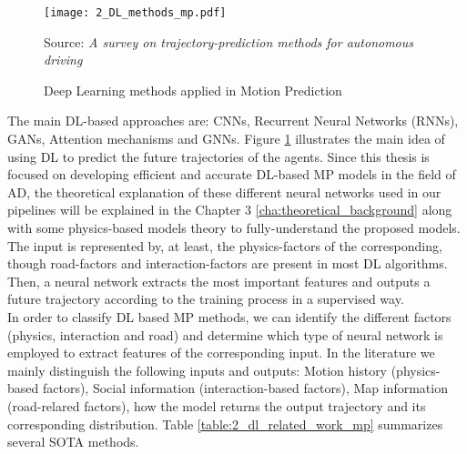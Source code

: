 \begin{figure}[h]
	\centering
	\texttt{[image: 2\_DL\_methods\_mp.pdf]}
	\caption{Deep Learning methods applied in Motion Prediction}
	Source: \textit{A survey on trajectory-prediction methods for autonomous driving} \cite{huang2022survey}
	\label{fig:2_DL_example_mp}
\end{figure}

The main DL-based approaches are: \acp{CNN}, Recurrent Neural Networks (RNNs), \acp{GAN}, Attention mechanisms and \acp{GNN}. Figure \ref{fig:2_DL_example_mp} illustrates the main idea of using \ac{DL} to predict the future trajectories of the agents. Since this thesis is focused on developing efficient and accurate \ac{DL}-based \ac{MP} models in the field of \ac{AD}, the theoretical explanation of these different neural networks used in our pipelines will be explained in the Chapter 3 \ref{cha:theoretical_background} along with some physics-based models theory to fully-understand the proposed models. The input is represented by, at least, the physics-factors of the corresponding, though road-factors and interaction-factors are present in most \ac{DL} algorithms. Then, a neural network extracts the most important features and outputs a future trajectory according to the training process in a supervised way. \\

In order to classify \ac{DL} based \ac{MP} methods, we can identify the different factors (physics, interaction and road) and determine which type of neural network is employed to extract features of the corresponding input. In the literature we mainly distinguish the following inputs and outputs: Motion history (physics-based factors), Social information (interaction-based factors), Map information (road-relared factors), how the model returns the output trajectory and its corresponding distribution. Table \ref{table:2_dl_related_work_mp} summarizes several SOTA methods.

